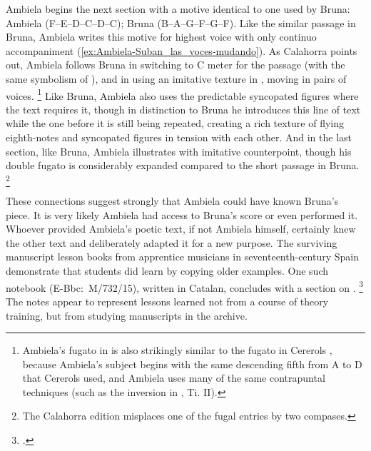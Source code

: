 Ambiela begins the next section with a motive identical to one used by Bruna: Ambiela  (F--E--D--C\sh--D--C\sh); Bruna  (B\fl--A--G--F\sh--G--F\sh).
Like the similar passage in Bruna, Ambiela writes this motive for highest voice with only continuo accompaniment (\cref{ex:Ambiela-Suban_las_voces-mudando}).
As Calahorra points out, Ambiela follows Bruna in switching to C meter for the  passage (with the same symbolism of ), and in using an imitative texture in , moving  in pairs of voices.%
	\footnote{%
Ambiela's fugato in  is also strikingly similar to the fugato in Cererols , because Ambiela's subject begins with the same descending fifth from A to D that Cererols used, and Ambiela uses many of the same contrapuntal techniques (such as the inversion in , Ti. II).
	}
Like Bruna, Ambiela also uses the predictable syncopated figures where the text requires it, though in distinction to Bruna he introduces this line of text while the one before it is still being repeated, creating a rich texture of flying eighth-notes and syncopated figures in tension with each other.
And in the last section, like Bruna, Ambiela illustrates  with imitative counterpoint, though his double fugato is considerably expanded compared to the short passage in Bruna.%
	\footnote{%
	The Calahorra edition misplaces one of the fugal entries by two compases.
	}


These connections suggest strongly that Ambiela could have known Bruna's piece.
It is very likely Ambiela had access to Bruna's score or even performed it.
Whoever provided Ambiela's poetic text, if not Ambiela himself, certainly knew the other text and deliberately adapted it for a new purpose.
The surviving manuscript lesson books from apprentice musicians in seventeenth-century Spain demonstrate that students did learn by copying older examples. 
One such notebook (E-Bbc:~M/732/15), written in Catalan, concludes with a section on .%
	\footnote{%
	.
	}
The notes appear to represent lessons learned not from a course of theory training, but from studying manuscripts in the archive.

